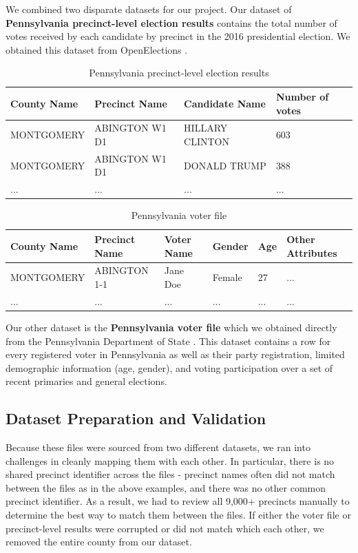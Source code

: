 \documentclass[10pt, letterpaper]{article}
\begin{document}
\begin{multicols}{2}
We combined two disparate datasets for our project. 
Our dataset of \textbf{Pennsylvania precinct-level election results} contains the total number of votes received by each candidate by precinct in the 2016 presidential election. We obtained this dataset from OpenElections \cite{OpenElections}.
\begin{table}
\caption{Pennsylvania precinct-level election results}
\begin{center}
\begin{tabular}{ |l|l|l|l| } 
\hline
County Name & Precinct Name & Candidate Name & Number of votes \\
\hline \hline
MONTGOMERY & ABINGTON W1 D1 & HILLARY CLINTON & 603  \\
\hline
MONTGOMERY & ABINGTON W1 D1 & DONALD TRUMP & 388  \\
\hline
... & ...& ... & ...  \\
\hline
\end{tabular}
\end{center}
\end{table}
\begin{table}
\label{tab:datasets}
\caption{Pennsylvania voter file}
\begin{center}
\begin{tabular}{ |l|l|l|l|l|l| } 
\hline
County Name & Precinct Name & Voter Name & Gender & Age & Other Attributes \\
\hline \hline
MONTGOMERY & ABINGTON 1-1 & Jane Doe & Female & 27 & ... \\
\hline
... & ... & ... & ... & ... & ... \\
\hline
\end{tabular}
\end{center}
\end{table}
Our other dataset is the \textbf{Pennsylvania voter file} which we obtained directly from the Pennsylvania Department of State \cite{PAVoterFile}. This dataset contains a row for every registered voter in Pennsylvania as well as their party registration, limited demographic information (age, gender), and voting participation over a set of recent primaries and general elections.

\subsection{Dataset Preparation and Validation}

Because these files were sourced from two different datasets, we ran into challenges in cleanly mapping them with each other. In particular, there is no shared precinct identifier across the files - precinct names often did not match between the files as in the above examples, and there was no other common precinct identifier. As a result, we had to review all 9,000+ precincts manually to determine the best way to match them between the files. If either the voter file or precinct-level results were corrupted or did not match which each other, we removed the entire county from our dataset.


\end{multicols}
\end{document}
